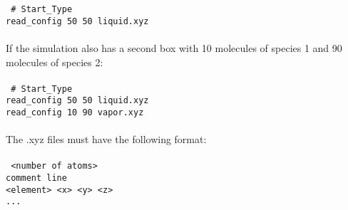 \begin{itemize}
%
\texttt{
\# Start\_Type \\
read\_config 50 50 liquid.xyz \\} \\
%
If the simulation also has a second box with 10 molecules of species 1 and 90 molecules of species 2: \\ \\
%
\texttt{
\# Start\_Type \\
read\_config 50 50 liquid.xyz \\
read\_config 10 90 vapor.xyz \\} \\
%
The .xyz files must have the following format:\\ \\
%
\texttt{
 <number of atoms>\\
 comment line\\
 <element> <x> <y> <z>\\
 ...\\
} \\
%


\end{itemize}
